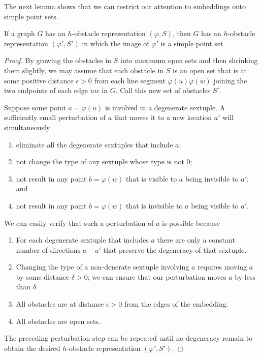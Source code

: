\documentclass{patmorin}
\begin{document}
The next lemma shows that we can restrict our attention to embeddings
onto simple point sets.

\begin{lem}
  If a graph $G$ has an $h$-obstacle representation $(\varphi, S)$,
  then $G$ has an $h$-obstacle representation $(\varphi',S')$ in which
  the image of $\varphi'$ is a simple point set.
\end{lem}

\begin{proof}
  By growing the obstacles in $S$ into maximum open sets and then
  shrinking them slightly, we may assume that each obstacle in $S$ is
  an open set that is at some positive distance $\epsilon >0$ from each
  line segment $\varphi(u)\varphi(w)$ joining the two endpoints of each
  edge $uw$ in $G$.  Call this new set of obstacles $S'$.

  Suppose some point $a=\varphi(u)$ is involved in a degenerate sextuple.
  A sufficiently small perturbation of $a$ that moves it to a new location
  $a'$ will simultaneously
  \begin{enumerate}
    \item eliminate all the degenerate sextuples that include $a$;
    \item not change the type of any sextuple whose type is not 0; 
    \item not result in any point $b=\varphi(w)$ that is visible to $a$
      being invisible to $a'$; and
    \item not result in any point $b=\varphi(w)$ that is invisible to $a$
      being visible to $a'$.
  \end{enumerate}
  We can easily verify that such a perturbation of $a$ is possible because
  \begin{enumerate}
    \item For each degenerate sextuple that includes $a$ there are only a
    constant number of directions $a-a'$ that preserve the degeneracy of
    that sextuple.
    \item Changing the type of a non-denerate sextuple involving $a$
    requires moving $a$ by some distance $\delta >0$;  we can ensure
    that our perturbation moves $a$ by less than $\delta$.
    \item All obstacles are at distance $\epsilon >0$ from the
    edges of the embedding.
    \item All obstacles are open sets.
  \end{enumerate}
  The preceding perturbation step can be repeated until no
  degeneracy remain to obtain the desired $h$-obstacle representation
  $(\varphi',S')$.
\end{proof}
\end{document}
